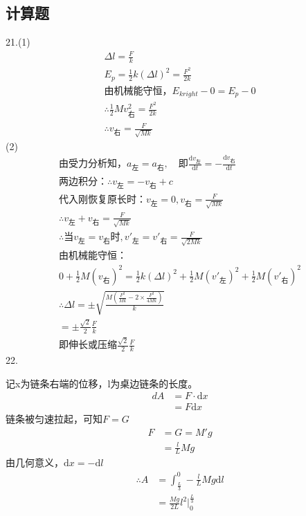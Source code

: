 \documentclass[blue, normal]{./templete/qyxfnote}
\newcommand{\di}[1]{\mathrm{d}#1}
\newcommand{\dy}[2]{\frac{\di{#1}}{\di{#2}}}
\begin{document}
\begin{multicols}{2}
	\subsection{计算题}
	21.(1)
	\begin{gather*}
	\Delta l=\frac{F}{k}\\
	E_p=\frac{1}{2}k(\Delta l)^2=\frac{F^2}{2k}\\
	\text{由机械能守恒，}E_{kright}-0=E_p-0\\
	\therefore\frac{1}{2}Mv_{\text{右}}^2=\frac{F^2}{2k}\\
	\therefore v_{\text{右}}=\frac{F}{\sqrt{Mk}}
	\end{gather*}
	(2)
	\begin{gather*}
	\text{由受力分析知，}a_{\text{左}}=a_{\text{右}},\quad\text{即}\dy{v_{\text{左}}}{t}=-\dy{v_{\text{右}}}{t}\\
	\text{两边积分：}\therefore v_{\text{左}}=-v_{\text{右}}+c\\
	\text{代入刚恢复原长时：}v_{\text{左}}=0,v_{\text{右}}=\frac{F}{\sqrt{Mk}}\\
	\therefore v_{\text{左}}+v_{\text{右}}=\frac{F}{\sqrt{Mk}}\\
	\therefore\text{当}v_{\text{左}}=v_{\text{右}}\text{时},v'_{\text{左}}=v'_{\text{右}}=\frac{F}{\sqrt{2Mk}}\\
	\text{由机械能守恒：}\\
	0+\frac{1}{2}M(v_{\text{右}})^2=\frac{1}{2}k(\Delta l)^2+\frac{1}{2}M(v'_{\text{左}})^2+\frac{1}{2}M(v'_{\text{右}})^2\\
	\therefore\Delta l=\pm\sqrt{\frac{M\left(\frac{F^2}{Mk}-2\times\frac{F^2}{4Mk}\right)}{k}}\\
	=\pm\frac{\sqrt{2}}{2}\frac{F}{k}\\
	\text{即伸长或压缩}\frac{\sqrt{2}}{2}\frac{F}{k}
	\end{gather*}
	22.\par 
	记x为链条右端的位移，l为桌边链条的长度。
	\begin{align*}
	dA	&=F\cdot\di{x}\\
	&=F\di{x}
	\end{align*}
	链条被匀速拉起，可知$F=G$
	\begin{align*}
	F	&=G=M'g\\
	&=\frac{l}{L}Mg
	\end{align*}
	由几何意义，$\di{x}=-\di{l}$
	\begin{align*}
	\therefore A&=\int_{\frac{L}{3}}^{0} -\frac{l}{L}Mg\di{l}\\
	&=\frac{Mg}{2L}l^2\left.\right|_{0}^{\frac{L}{3}}\\

\end{align*}
\end{multicols}
\end{document}
